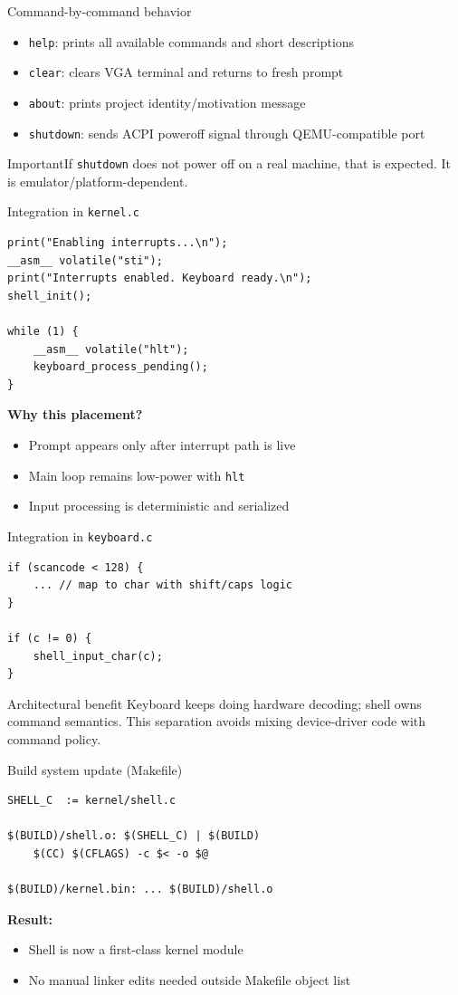 \documentclass[aspectratio=169]{beamer}
\newcommand{\concept}[2]{%
  \begin{block}{#1}\smallskip #2\smallskip\end{block}\vspace{5pt}}
\newcommand{\warn}[1]{%
  \begin{alertblock}{Important}\smallskip #1\smallskip\end{alertblock}\vspace{5pt}}
\begin{document}
\begin{frame}{Command-by-command behavior}
  \begin{itemize}
    \item \texttt{help}: prints all available commands and short descriptions
    \item \texttt{clear}: clears VGA terminal and returns to fresh prompt
    \item \texttt{about}: prints project identity/motivation message
    \item \texttt{shutdown}: sends ACPI poweroff signal through QEMU-compatible port
  \end{itemize}
  \warn{If \texttt{shutdown} does not power off on a real machine, that is expected. It is emulator/platform-dependent.}
\end{frame}

\begin{frame}[fragile]{Integration in \texttt{kernel.c}}
\begin{lstlisting}[style=clang]
print("Enabling interrupts...\n");
__asm__ volatile("sti");
print("Interrupts enabled. Keyboard ready.\n");
shell_init();

while (1) {
    __asm__ volatile("hlt");
    keyboard_process_pending();
}
\end{lstlisting}
\textbf{Why this placement?}
\begin{itemize}
  \item Prompt appears only after interrupt path is live
  \item Main loop remains low-power with \texttt{hlt}
  \item Input processing is deterministic and serialized
\end{itemize}
\end{frame}

\begin{frame}[fragile]{Integration in \texttt{keyboard.c}}
\begin{lstlisting}[style=clang]
if (scancode < 128) {
    ... // map to char with shift/caps logic
}

if (c != 0) {
    shell_input_char(c);
}
\end{lstlisting}
\concept{Architectural benefit}{
  Keyboard keeps doing hardware decoding; shell owns command semantics.
  This separation avoids mixing device-driver code with command policy.
}
\end{frame}

\begin{frame}[fragile]{Build system update (Makefile)}
\begin{lstlisting}[style=clang]
SHELL_C  := kernel/shell.c

$(BUILD)/shell.o: $(SHELL_C) | $(BUILD)
    $(CC) $(CFLAGS) -c $< -o $@

$(BUILD)/kernel.bin: ... $(BUILD)/shell.o
\end{lstlisting}
\textbf{Result:}
\begin{itemize}
  \item Shell is now a first-class kernel module
  \item No manual linker edits needed outside Makefile object list
\end{itemize}
\end{frame}
\end{document}
